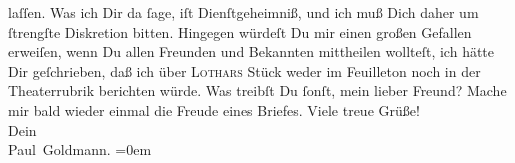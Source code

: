 \begin{ledgroupsized}[t]{13cm}
               laſſen.\pend
           \pstart
           Was \strikeout{\textcolor{gray}{×}} ich Dir da ſage, iſt Dienſtgeheimniß, und ich muß Dich daher um ſtrengſte
               Diskretion bitten.\pend
           \pstart
           {\pb}Hingegen würdeſt Du mir einen großen Gefallen
               erweiſen, wenn Du allen Freunden und Bekannten mittheilen wollteſt, ich hätte Dir
               geſchrieben, daß ich über \textsc{Lothars}{ }Stück weder im Feuilleton noch in der Theaterrubrik berichten würde.\pend
           \pstart
           Was treibſt Du ſonſt, mein lieber Freund? Mache mir bald wieder einmal die Freude
               eines Briefes.\pend
           \pstart
           Viele treue Grüße! {\\[\baselineskip]}Dein {\\[\baselineskip]}\spacefill\mbox{Paul Goldmann.}\pend
           \leftskip=0em{}
         
         \endnumbering{}\end{ledgroupsized}  \newcommand{\dateiname}{L02915}\newcommand{\titel}{Paul Goldmann an Arthur Schnitzler, 10. 5. [1900]}\newcommand{\editorInnen}{Martin Anton Müller und Laura Untner}
      